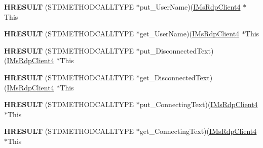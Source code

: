 \begin{DoxyCompactItemize}
\item 
\mbox{\label{struct_m_s_t_s_c_lib_1_1_i_ms_rdp_client4_vtbl_adf96587fa590bc0d81e3a879789770d7}} 
{\bfseries H\+R\+E\+S\+U\+LT} (S\+T\+D\+M\+E\+T\+H\+O\+D\+C\+A\+L\+L\+T\+Y\+PE $\ast$put\+\_\+\+User\+Name)(\hyperlink{interface_m_s_t_s_c_lib_1_1_i_ms_rdp_client4}{I\+Ms\+Rdp\+Client4} $\ast$This
\item 
\mbox{\label{struct_m_s_t_s_c_lib_1_1_i_ms_rdp_client4_vtbl_aa9faef3a7214a6f0643b3e9dd4e66526}} 
{\bfseries H\+R\+E\+S\+U\+LT} (S\+T\+D\+M\+E\+T\+H\+O\+D\+C\+A\+L\+L\+T\+Y\+PE $\ast$get\+\_\+\+User\+Name)(\hyperlink{interface_m_s_t_s_c_lib_1_1_i_ms_rdp_client4}{I\+Ms\+Rdp\+Client4} $\ast$This
\item 
\mbox{\label{struct_m_s_t_s_c_lib_1_1_i_ms_rdp_client4_vtbl_a7efa6be9fec725eaed6f61d6f2b06e42}} 
{\bfseries H\+R\+E\+S\+U\+LT} (S\+T\+D\+M\+E\+T\+H\+O\+D\+C\+A\+L\+L\+T\+Y\+PE $\ast$put\+\_\+\+Disconnected\+Text)(\hyperlink{interface_m_s_t_s_c_lib_1_1_i_ms_rdp_client4}{I\+Ms\+Rdp\+Client4} $\ast$This
\item 
\mbox{\label{struct_m_s_t_s_c_lib_1_1_i_ms_rdp_client4_vtbl_ae9f97ad29ec86dcda8e54a015a989016}} 
{\bfseries H\+R\+E\+S\+U\+LT} (S\+T\+D\+M\+E\+T\+H\+O\+D\+C\+A\+L\+L\+T\+Y\+PE $\ast$get\+\_\+\+Disconnected\+Text)(\hyperlink{interface_m_s_t_s_c_lib_1_1_i_ms_rdp_client4}{I\+Ms\+Rdp\+Client4} $\ast$This
\item 
\mbox{\label{struct_m_s_t_s_c_lib_1_1_i_ms_rdp_client4_vtbl_abde7a0e9bee7689d831a4d8888edf48a}} 
{\bfseries H\+R\+E\+S\+U\+LT} (S\+T\+D\+M\+E\+T\+H\+O\+D\+C\+A\+L\+L\+T\+Y\+PE $\ast$put\+\_\+\+Connecting\+Text)(\hyperlink{interface_m_s_t_s_c_lib_1_1_i_ms_rdp_client4}{I\+Ms\+Rdp\+Client4} $\ast$This
\item 
\mbox{\label{struct_m_s_t_s_c_lib_1_1_i_ms_rdp_client4_vtbl_a9e4aa67af08a79f1318283ef590117f0}} 
{\bfseries H\+R\+E\+S\+U\+LT} (S\+T\+D\+M\+E\+T\+H\+O\+D\+C\+A\+L\+L\+T\+Y\+PE $\ast$get\+\_\+\+Connecting\+Text)(\hyperlink{interface_m_s_t_s_c_lib_1_1_i_ms_rdp_client4}{I\+Ms\+Rdp\+Client4} $\ast$This

\end{DoxyCompactItemize}
